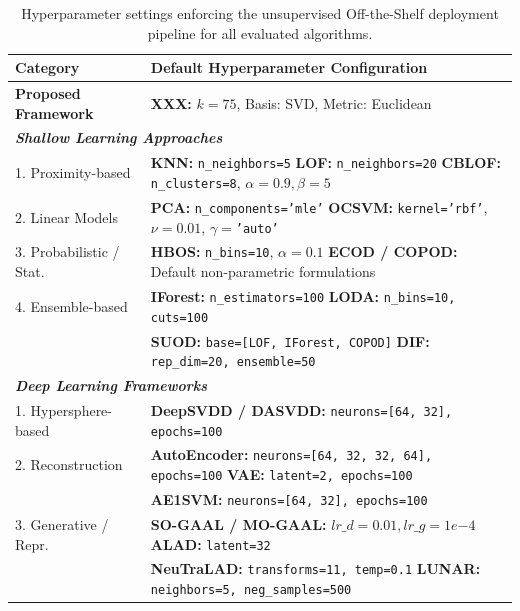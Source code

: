 \documentclass[final,twocolumn,10pt]{elsarticle}
\begin{document}
\begin{table}[h]
\centering
\caption{Hyperparameter settings enforcing the unsupervised Off-the-Shelf deployment pipeline for all evaluated algorithms.}
\label{tab:hyperparameters}
\scriptsize
\begin{tabular}{ll}
\toprule
\textbf{Category} & \textbf{Default Hyperparameter Configuration} \\
\midrule
\textbf{Proposed Framework}  & \textbf{XXX:} $k=75$, Basis: SVD, Metric: Euclidean \\
\midrule
\multicolumn{2}{l}{\textit{\textbf{Shallow Learning Approaches}}} \\
1. Proximity-based     & \textbf{KNN:} \texttt{n\_neighbors=5} \quad \textbf{LOF:} \texttt{n\_neighbors=20} \quad \textbf{CBLOF:} \texttt{n\_clusters=8}, $\alpha=0.9, \beta=5$ \\
2. Linear Models       & \textbf{PCA:} \texttt{n\_components='mle'} \quad \textbf{OCSVM:} \texttt{kernel='rbf'}, $\nu=0.01$, $\gamma=$\texttt{'auto'} \\
3. Probabilistic / Stat. & \textbf{HBOS:} \texttt{n\_bins=10}, $\alpha=0.1$ \quad \textbf{ECOD / COPOD:} Default non-parametric formulations \\
4. Ensemble-based      & \textbf{IForest:} \texttt{n\_estimators=100} \quad \textbf{LODA:} \texttt{n\_bins=10, cuts=100} \vspace{0.05cm} \\
                             & \textbf{SUOD:} \texttt{base=[LOF, IForest, COPOD]} \quad \textbf{DIF:} \texttt{rep\_dim=20, ensemble=50} \\
\midrule
\multicolumn{2}{l}{\textit{\textbf{Deep Learning Frameworks}}} \\
1. Hypersphere-based   & \textbf{DeepSVDD / DASVDD:} \texttt{neurons=[64, 32], epochs=100} \\
2. Reconstruction      & \textbf{AutoEncoder:} \texttt{neurons=[64, 32, 32, 64], epochs=100} \quad \textbf{VAE:} \texttt{latent=2, epochs=100} \vspace{0.05cm} \\
                             & \textbf{AE1SVM:} \texttt{neurons=[64, 32], epochs=100} \\
3. Generative / Repr.  & \textbf{SO-GAAL / MO-GAAL:} $lr\_d=0.01, lr\_g=1e{-4}$ \quad \textbf{ALAD:} \texttt{latent=32} \vspace{0.05cm} \\
                             & \textbf{NeuTraLAD:} \texttt{transforms=11, temp=0.1} \quad \textbf{LUNAR:} \texttt{neighbors=5, neg\_samples=500}\\
\bottomrule
\end{tabular}
\end{table}
\end{document}
